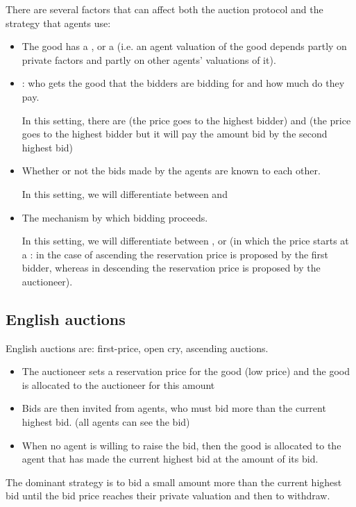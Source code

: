 There are several factors that can affect both the auction protocol and the strategy that agents use:
\begin{itemize}
\item The good has a ,  or a  (i.e. an agent valuation of the good depends partly on private factors and partly on other agents' valuations of it).
\item {}: who gets the good that the bidders are bidding for and how much do they pay.

In this setting, there are  (the price goes to the highest bidder) and  (the price goes to the highest bidder but it will pay the amount bid by the second highest bid)
\item Whether or not the bids made by the agents are known to each other.

In this setting, we will  differentiate between  and 
\item The mechanism by which bidding proceeds.

In this setting, we will differentiate between ,  or  (in which the price starts at a : in the case of ascending the reservation price is proposed by the first bidder, whereas in descending the reservation price is proposed by the auctioneer).
\end{itemize}
\subsection{English auctions}
English auctions are: first-price, open cry, ascending auctions.

\begin{itemize}
\item The auctioneer sets a reservation price for the good (low price) and the good is allocated to the auctioneer for this amount
\item Bids are then invited from agents, who must bid more than the current highest bid. (all agents can see the bid)
\item When no agent is willing to raise the bid, then the good is allocated to the agent that has made the current highest bid at the amount of its bid.
\end{itemize}

The dominant strategy is to bid a small amount more than the current highest bid until the bid price reaches their private valuation and then to withdraw.


